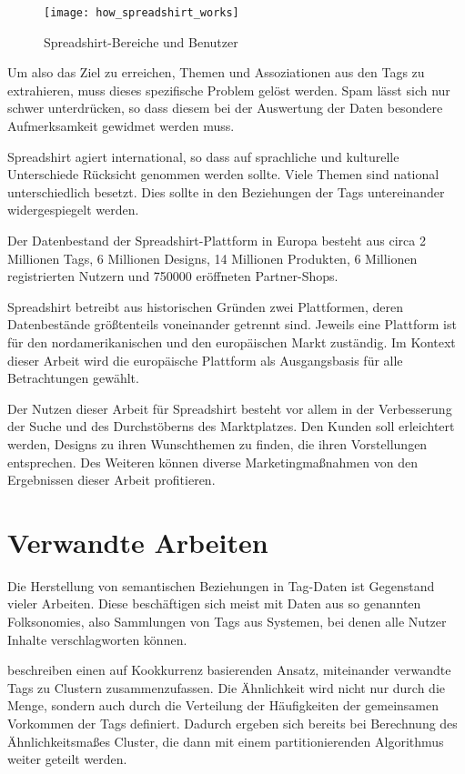 \begin{figure}
\centering
\texttt{[image: how\_spreadshirt\_works]}
\caption{Spreadshirt-Bereiche und Benutzer}
\label{fig:howspreadshirtworks}
\end{figure}

Um also das Ziel zu erreichen, Themen und Assoziationen aus den Tags zu extrahieren, muss dieses spezifische Problem gelöst werden. Spam lässt sich nur schwer unterdrücken, so dass diesem bei der Auswertung der Daten besondere Aufmerksamkeit gewidmet werden muss.

Spreadshirt agiert international, so dass auf sprachliche und kulturelle Unterschiede Rücksicht genommen werden sollte. Viele Themen sind national unterschiedlich besetzt. Dies sollte in den Beziehungen der Tags untereinander widergespiegelt werden.

Der Datenbestand der Spreadshirt-Plattform in Europa besteht aus circa 2 Millionen Tags, 6 Millionen Designs, 14 Millionen Produkten, 6 Millionen registrierten Nutzern und \num{750000} eröffneten Partner-Shops.

\label{platforms}
Spreadshirt betreibt aus historischen Gründen zwei Plattformen, deren Datenbestände größtenteils voneinander getrennt sind. Jeweils eine Plattform ist für den nordamerikanischen und den europäischen Markt zuständig. Im Kontext dieser Arbeit wird die europäische Plattform als Ausgangsbasis für alle Betrachtungen gewählt.

Der Nutzen dieser Arbeit für Spreadshirt besteht vor allem in der Verbesserung der Suche und des Durchstöberns des Marktplatzes. Den Kunden soll erleichtert werden, Designs zu ihren Wunschthemen zu finden, die ihren Vorstellungen entsprechen. Des Weiteren können diverse Marketingmaßnahmen von den Ergebnissen dieser Arbeit profitieren.

\section{Verwandte Arbeiten}

Die Herstellung von semantischen Beziehungen in Tag-Daten ist Gegenstand vieler Arbeiten. Diese beschäftigen sich meist mit Daten aus so genannten Folksonomies, also Sammlungen von Tags aus Systemen, bei denen alle Nutzer Inhalte verschlagworten können.

\textcite{bks2006} beschreiben einen auf Kookkurrenz basierenden Ansatz, miteinander verwandte Tags zu Clustern zusammenzufassen. Die Ähnlichkeit wird nicht nur durch die Menge, sondern auch durch die Verteilung der Häufigkeiten der gemeinsamen Vorkommen der Tags definiert. Dadurch ergeben sich bereits bei Berechnung des Ähnlichkeitsmaßes Cluster, die dann mit einem partitionierenden Algorithmus weiter geteilt werden.

